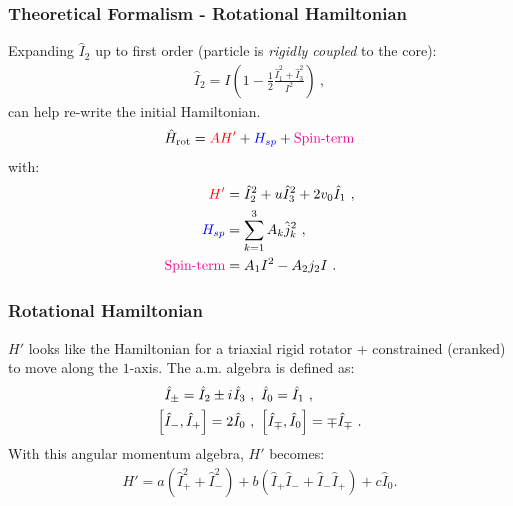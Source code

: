 \documentclass{beamer}
\newcommand{\iu}{{i\mkern1mu}}
\begin{document}
\begin{frame}
  \frametitle{Theoretical Formalism - Rotational Hamiltonian}

  Expanding $\hat{I}_2$ up to first order (particle is \emph{rigidly coupled} to the core):
  \begin{align}
    \hat{I}_2=I\left(1-\frac{1}{2}\frac{\hat{I}_1^2+\hat{I}_3^2}{I^2}\right)\ ,
  \end{align}
can help re-write the initial Hamiltonian. %
\begin{align}
  \hat{H}_\text{rot}={\color{red}AH'}+{\color{blue}H_{sp}}+{\color{magenta}\text{Spin-term}}
\end{align}
with:
\begin{align}
  {\color{red}H'}&=\hat{I}_2^2+u\hat{I}_3^2+2v_0\hat{I}_1\ ,\\
  {\color{blue}H_{sp}}&=\sum_{k=1}^3A_k\hat{j}_k^2\ ,\\
  {\color{magenta}\text{Spin-term}}&=A_1I^2-A_2j_2I\ .
\end{align}
\end{frame}

\begin{frame}
  \frametitle{Rotational Hamiltonian}
  $H'$ looks like the Hamiltonian for a triaxial rigid rotator + constrained (cranked) to move along the $1$-axis. The a.m. algebra is defined as:
\begin{align}
  \hat{I}_\pm=\hat{I}_2\pm \iu\hat{I}_3\ &,\ \hat{I}_0=\hat{I}_1\ ,\\
  \left[\hat{I}_-,\hat{I}_+\right]=2\hat{I}_0\ &,\ \left[\hat{I}_\mp,\hat{I}_0\right]=\mp\hat{I}_\mp\ .
\end{align}
With this angular momentum algebra, $H'$ becomes:
\begin{align}
  H'=a\left(\hat{I}_+^2+\hat{I}_-^2\right)+b\left(\hat{I}_+\hat{I}_-+\hat{I}_-\hat{I}_+\right)+c\hat{I}_0.
\end{align}
\end{frame}
\end{document}

